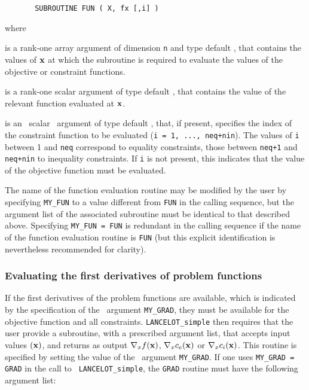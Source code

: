 \documentclass{galahad}
\begin{document}
\def\baselinestretch{0.8}
{\tt \begin{verbatim}
       SUBROUTINE FUN ( X, fx [,i] )
\end{verbatim} }\def\baselinestretch{1.0}
\noindent
where
\begin{description}
 is a rank-one \intentin array argument of
dimension {\tt n} and type default \realdp,
that contains the values of ${\mathbf{x}}$ at which the
subroutine is required to evaluate the values
of the objective or constraint functions.

 is a rank-one \intentout scalar argument of
  type default \realdp, that contains the value of the relevant
  function evaluated at ${\mathbf{x}}$.

 is an \optional\ scalar \intentin\ argument of type default \integer,
that, if present, specifies the index of the constraint function to be
evaluated  ({\tt i = 1, ..., neq+nin}).  The values of {\tt i}
between 1 and {\tt neq} correspond to equality constraints, those between
{\tt neq+1} and {\tt neq+nin} to inequality constraints. If {\tt i} is not
present, this indicates that the value of the objective function must be
evaluated.
\end{description}

\noindent
The name of the function evaluation routine may be modified by the user
by specifying {\tt MY\_FUN} to a value different from {\tt FUN} in the calling
sequence, but the argument list of the associated subroutine must be identical
to that described above. Specifying  {\tt MY\_FUN = FUN} is redundant in the
calling sequence if the name of the function evaluation routine is {\tt FUN}
(but this explicit identification is nevertheless recommended for clarity).

\subsubsection{Evaluating the first derivatives of problem functions\label{pfg}}

If the first derivatives of the problem functions are available, which is
indicated by the specification of the \optional\ argument {\tt MY\_GRAD}, they
must be available for the objective function and all constraints.
{\tt LANCELOT\_simple} then requires that the user provide a subroutine, with
a  prescribed argument list, that accepts input values $({\mathbf{x}})$, and returns as
output  $\nabla_x f({\mathbf{x}})$,  $\nabla_x c_e({\mathbf{x}})$ or $\nabla_x c_i({\mathbf{x}})$.
This routine is specified by setting the value of the \optional\ argument
{\tt MY\_GRAD}. If one uses {\tt MY\_GRAD = GRAD} in the call to {\tt
  LANCELOT\_simple}, the {\tt GRAD} routine must have the following argument
list:
\end{document}

